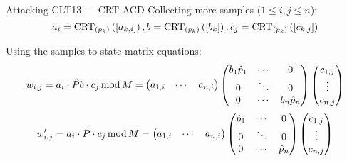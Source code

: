 \documentclass[english]{beamer}
\begin{document}
    \begin{frame}{Attacking CLT13 --- CRT-ACD}
        Collecting more samples ($1 \leq i,j \leq n$):
        \begin{equation*}
            a_i = \crtp[k]{a_{k, i}}, b = \crtp[k]{b_k}, c_j = \crtp[k]{c_{k, j}}
        \end{equation*}

        Using the samples to state matrix equations:
        \begin{equation*}
            w_{i,j} = a_i \cdot \hat{P} b \cdot c_j \smod M =
            \begin{pmatrix}
                a_{1, i} & \cdots & a_{n, i}
            \end{pmatrix}
            \begin{pmatrix}
                b_1 \hat{p}_1 & \cdots & 0 \\
                0 & \ddots & 0 \\
                0 & \cdots & b_n \hat{p}_n
            \end{pmatrix}
            \begin{pmatrix}
                c_{1, j} \\
                \vdots \\
                c_{n, j}
            \end{pmatrix}
        \end{equation*}
        \begin{equation*}
            w'_{i,j} = a_i \cdot \hat{P} \cdot c_j \smod M =
            \begin{pmatrix}
                a_{1, i} & \cdots & a_{n, i}
            \end{pmatrix}
            \begin{pmatrix}
                \hat{p}_1 & \cdots & 0 \\
                0 & \ddots & 0 \\
                0 & \cdots & \hat{p}_n
            \end{pmatrix}
            \begin{pmatrix}
                c_{1, j} \\
                \vdots \\
                c_{n, j}
            \end{pmatrix}
        \end{equation*}
    \end{frame}
\end{document}
